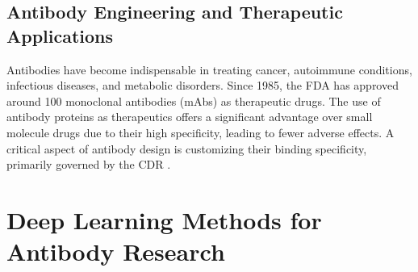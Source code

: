 \subsection{Antibody Engineering and Therapeutic Applications}
Antibodies have become indispensable in treating cancer, autoimmune conditions, infectious diseases, and metabolic disorders. Since 1985, the FDA has approved around 100 monoclonal antibodies (mAbs) as therapeutic drugs. The use of antibody proteins as therapeutics offers a significant advantage over small molecule drugs due to their high specificity, leading to fewer adverse effects. A critical aspect of antibody design is customizing their binding specificity, primarily governed by the CDR \citep{Melnyk2023}.


\section{Deep Learning Methods for Antibody Research}

